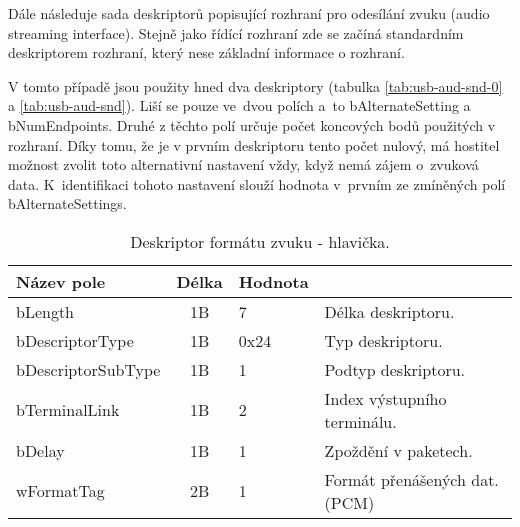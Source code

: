 Dále následuje sada deskriptorů popisující rozhraní pro odesílání zvuku (audio streaming interface). Stejně jako řídící rozhraní zde se začíná standardním  deskriptorem rozhraní, který nese základní informace o rozhraní.

V tomto případě jsou použity hned dva deskriptory (tabulka \ref{tab:usb-aud-snd-0} a \ref{tab:usb-aud-snd}). Liší se pouze ve~dvou polích a~to   bAlternateSetting a bNumEndpoints. Druhé z těchto polí určuje počet koncových bodů použitých v rozhraní. Díky tomu, že je v prvním deskriptoru tento počet nulový, má hostitel možnost zvolit toto alternativní nastavení vždy, když nemá zájem o~zvuková data. K~identifikaci tohoto nastavení slouží hodnota v~prvním ze zmíněných polí bAlternateSettings.

\begin{table}[ht!]
\begin{center}
\begin{tabular}{|l|c|l|l|}
\hline 
Název pole & Délka & Hodnota &  \\ 
\hline
bLength & 1B & 7 & Délka deskriptoru.\\
\hline
bDescriptorType & 1B & 0x24 & Typ deskriptoru. \\
\hline
bDescriptorSubType & 1B & 1 & Podtyp deskriptoru. \\
\hline
bTerminalLink & 1B & 2 & Index výstupního terminálu.\\ 
\hline
bDelay & 1B & 1 & Zpoždění v paketech.\\ 
\hline
wFormatTag & 2B & 1 & Formát přenášených dat. (PCM)\\ 
\hline
\end{tabular} 
\end{center}
\caption{Deskriptor formátu zvuku - hlavička.}
\label{tab:usb-aud-snd-fmt-head} 
\end{table}

